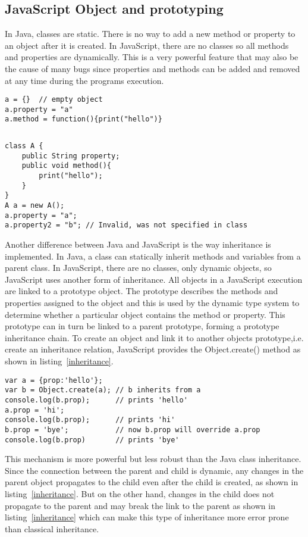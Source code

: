 \subsection{JavaScript Object and prototyping}
In Java, classes are static. There is no way to add a new method or property to an object after it is created. In JavaScript, there are no classes so all methods and properties are dynamically. This is a very powerful feature that may also be the cause of many bugs since properties and methods can be added and removed at any time during the programs execution.

\begin{lstlisting}[caption=JavaScript]
a = {} 	// empty object
a.property = "a"
a.method = function(){print("hello")}
\end{lstlisting}	

\begin{verbatim}

\end{verbatim}

\begin{lstlisting}[caption=Java]
class A {
	public String property;
	public void method(){
		print("hello");
	}
}
A a = new A();
a.property = "a";
a.property2 = "b"; // Invalid, was not specified in class
\end{lstlisting}	
Another difference between Java and JavaScript is the way inheritance is implemented. In Java, a class can statically inherit methods and variables from a parent class. In JavaScript, there are no classes, only dynamic objects, so JavaScript uses another form of inheritance. All objects in a JavaScript execution are linked to a prototype object. The prototype describes the methods and properties assigned to the object and this is used by the dynamic type system to determine whether a particular object contains the method or property. This prototype can in turn be linked to a parent prototype, forming a prototype inheritance chain. To create an object and link it to another objects prototype,i.e. create an inheritance relation, JavaScript provides the Object.create() method as shown in listing~\ref{inheritance}.

\begin{lstlisting}[caption=Inheritance,label=inheritance]
var a = {prop:'hello'};
var b = Object.create(a); // b inherits from a
console.log(b.prop);      // prints 'hello'
a.prop = 'hi';
console.log(b.prop);      // prints 'hi'
b.prop = 'bye';           // now b.prop will override a.prop
console.log(b.prop)       // prints 'bye'
\end{lstlisting}	
This mechanism is more powerful but less robust than the Java class inheritance. Since the connection between the parent and child is dynamic, any changes in the parent object propagates to the child even after the child is created, as shown in listing~\ref{inheritance}. But on the other hand, changes in the child does not propagate to the parent and may break the link to the parent as shown in listing~\ref{inheritance} which can make this type of inheritance more error prone than classical inheritance. 

